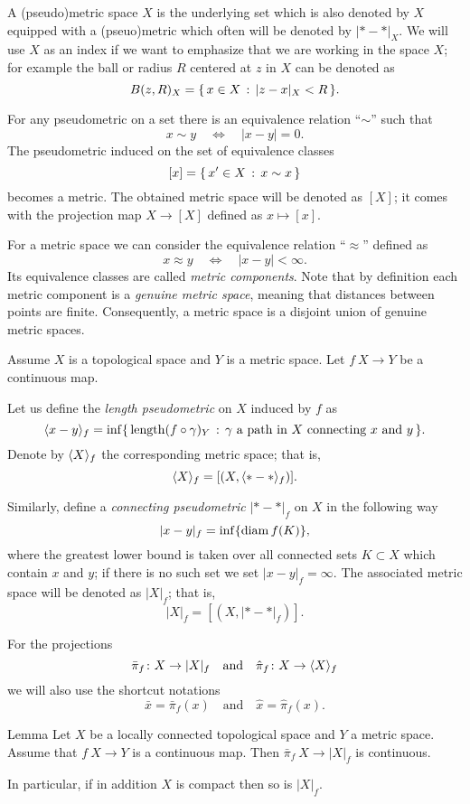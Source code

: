 \documentclass{article}
\begin{document}
A (pseudo)metric space $X$ is the underlying set which is also denoted by $X$ equipped with a (pseuo)metric which often will be denoted by $|{*}-{*}|_X$.
We will use $X$ as an index if we want to emphasize that we are working in the space $X$;
for example the ball or radius $R$ centered at $z$ in $X$ can be denoted as
\[B(z,R)_X=\{\,{x\in X}\,:\,{|z-x|_X<R}\,\}.\]


For any pseudometric on a set there is an equivalence relation ``$\sim$'' such that 
\[x\sim y\quad\iff\quad|x-y|=0.\]
The pseudometric induced  on the set of equivalence classes 
\[[x]=\{\,{x'\in X}\,:\,{x\sim x}\,\}\] becomes a metric.
The obtained metric space will be denoted as $[X]$;
it comes with the projection map $X\to [X]$ defined as $x\mapsto [x]$.

For a metric space we can consider the equivalence relation ``$\approx$'' defined as 
\[x\approx y\quad\iff\quad|x-y|<\infty.\]
Its equivalence classes are called \emph{metric components}.
Note that by definition each metric component is a \emph{genuine metric space}, meaning that distances between points are finite.
Consequently, a metric space is a disjoint union of genuine metric spaces.

Assume $X$ is a topological space and $Y$ is a metric space.
Let $f\:X\to Y$ be a continuous map. 

Let us define the \emph{length pseudometric} on $X$ induced by $f$ as
\[\< x-y\>_f
=
\inf
\set{\length(f\circ\gamma)_Y}{\gamma\ \text{a path in}\  X\ \text{connecting}\ x\ \text{and}\ y}.\]
Denote by $\langle X\rangle_f$ the corresponding metric space; that is,
\[\langle X\rangle_f=[(X,\langle{*}-{*}\rangle_f)].\] 

Similarly, define a \emph{connecting pseudometric} $|{*}-{*}|_f$ on $X$ in
the following way
\[|x-y|_f=\inf\{\mathop{\rm diam}\nolimits f(K)\},\]
where the greatest lower bound is taken over all connected sets $K\subset X$ which contain $x$ and $y$;
if there is no such set we set $|x-y|_f=\infty$. 
The associated metric space will be
denoted as $|X|_f$;
that is,
\[| X|_f=[(X,|{*}-{*}|_f)].\]

For the projections 
\[\bar \pi_f\colon X\to |X|_f\quad\text{and}\quad \hat \pi_f\colon X\to \langle X\rangle_f\]
we will also use the shortcut notations 
\[\bar x=\bar\pi_f(x) \quad\text{and}\quad  \hat x= \hat \pi_f(x).\]

\begin{thm}{Lemma}\label{lem:picont}
Let $X$ be a locally connected topological space and $Y$ a metric space. Assume that $f\:X\to Y$ is a continuous map. 
Then $\bar\pi_f\:X\to|X|_f$ is continuous.

In particular, if in addition $X$ is compact then so is $|X|_f$.
\end{thm}
\end{document}
